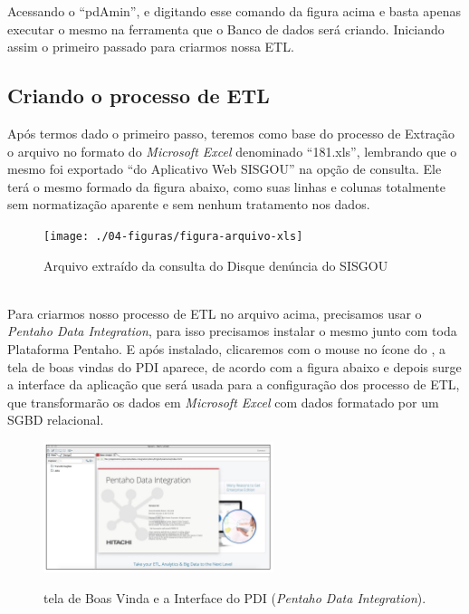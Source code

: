 Acessando o ``pdAmin'', e digitando esse comando da figura acima e basta apenas executar o mesmo na ferramenta que o Banco de dados ser\'{a} criando. Iniciando assim o primeiro passado para criarmos nossa ETL.

\subsection{Criando o processo de ETL}

Ap\'os termos dado o primeiro passo, teremos como base do processo de Extra\c{c}\~{a}o o arquivo no formato do \textit{Microsoft Excel} denominado ``181.xls'', lembrando que o mesmo foi exportado ``do Aplicativo Web SISGOU'' na op\c{c}\~{a}o de consulta. 
Ele ter\'{a} o mesmo formado da figura abaixo, como suas linhas e colunas totalmente sem normatiza\c{c}\~{a}o aparente e sem nenhum tratamento nos dados.


\begin{figure}[H]
	\vspace*{0,2cm}
    \centering
    \caption{Arquivo extraído da consulta do Disque denúncia do  SISGOU}
    \texttt{[image: ./04-figuras/figura-arquivo-xls]}
    \label{fig:ilustfigxls}
\end{figure}
\vspace*{-0,9cm}
{\raggedright {}} \\

Para criarmos nosso processo de ETL no arquivo acima, precisamos usar o \textit{Pentaho Data Integration}, para isso precisamos instalar o mesmo junto com toda Plataforma Pentaho. E ap\'os instalado,  clicaremos com o mouse no ícone do , a tela de boas vindas do PDI aparece, de acordo com a figura abaixo e depois surge a interface da aplica\c{c}\~{a}o que ser\'{a} usada para a configura\c{c}\~{a}o dos processo de ETL, que transformar\~{a}o os dados em \textit{Microsoft Excel} com dados formatado por um SGBD relacional.

\begin{figure}[H]
	\vspace*{0,2cm}
    \centering
    \caption{tela de Boas Vinda e a Interface do PDI (\textit{Pentaho Data Integration}).}
    \includegraphics[width=0.6\textwidth]{./04-figuras/figura-pentaho-pdi}
    \label{fig:ilustfigpentaho-pdi}
\end{figure}
\vspace*{-0,9cm}
{\raggedright {}} \\


